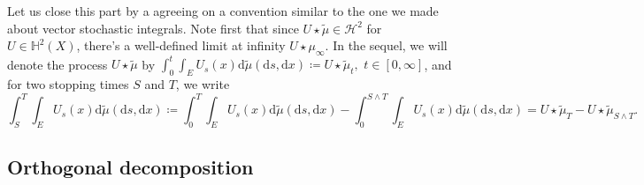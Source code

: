 \documentclass[10pt]{article} %
\newcommand\cH{\mathcal H}
\def \H{\mathbb{H}}
\newcommand{\1}{\mathbf{1}}
\def\d{\mathrm{d}}
\begin{document}
\medskip
Let us close this part by a agreeing on a convention similar to the one we made about vector stochastic integrals. Note first that since $U \star \tilde \mu \in \cH^2$ for $U \in \H^2(X)$, there's a well-defined limit at infinity $U \star \mu_\infty$. In the sequel, we will denote the process $U \star\tilde\mu$ by $\int_0^t \int_{E} U_s(x) \d \tilde\mu(\d s, \d x) \coloneqq U \star \tilde\mu_t,$ $t \in [0,\infty]$, and for two stopping times $S$ and $T$, we write
\begin{equation*}
	\int_S^T \int_{E} U_s(x) \d \tilde\mu(\d s, \d x) \coloneqq \int_0^T \int_{E} U_s(x) \d \tilde\mu(\d s, \d x) - \int_0^{S \land T} \int_{E} U_s(x) \d \tilde\mu(\d s, \d x) = U\star\tilde\mu_T - U\star\tilde\mu_{S \land T}.
\end{equation*}

\subsection{Orthogonal decomposition}
\end{document}
